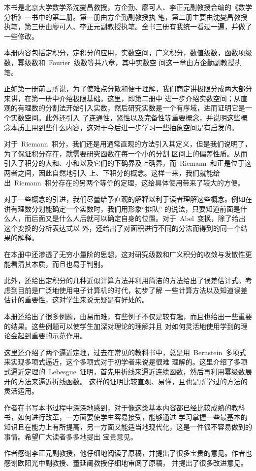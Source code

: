 
\begin{preface}
本书是北京大学数学系沈燮昌教授，方企勤、廖可人、李正元副教授合编的《数学分析》一书中的第二册。第一册由方企勤副教授执
笔，第二册主要由沈燮昌教授执笔，第三册由廖可人、李正元副教授执笔。全书三册有我统一看过一遍，并做了一些修改。

本册内容包括定积分，定积分的应用，实数空间，广义积分，数值级数，函数项级数，幂级数和~Fourier~级数等共八章，其中实数空
间这一章由方企勤副教授执笔。

正如第一册前言所说，为了使难点分散和便于理解，我们商定讲极限分成两大部分来讲，在第一册中介绍极限基础。这里，即第二册中
进一步介绍实数空间；从直观的有理数的分割法开始引入实数，然后研究实数是一个有序域，进而证明它是一个实数空间。此外还引入
了连通性，紧性以及完备性等重要概念，并说明这些概念本质上用到些什么内容，这对于今后进一步学习一些抽象空间是有启发的。

对于~Riemann~积分，我们还是用通常直观的方法引入其定义，但是我们说明了，为了保证积分存在，就需要研究函数在每一个小的分割
区间上的偏差性质。从而引入了积分的大和、小和以及它们的下确界及上确界，而~Riemann~和正是位于这两者之间，因此自然地引入
上、下积分的概念。这样一来，我们就能给出~Riemann~积分存在的另两个等价的定理，这给具体使用带来了较大的方便。

对于一些概念的引进，我们尽量给予直观的解释以利于读者理解这些概念。例如在讲有理数分划能确定一个实数时，我们用形象“排队”
的说法，只要知道前面是什么人，而后面又是什么人后就可以确定自身的位置。对于~Abel~变换，除了给出这个变换的分析表达式以
外，还给出了对面积进行不同的分法而得到的同一个结果的解释。

在本册中还渗透了无穷小量阶的思想，这对研究级数和广义积分的收敛与发散性更能看清其本质，而且也易于判别。

此外，还给出定积分的几种近似计算方法并利用简洁的方法给出了误差估计式。考虑到目前是广泛地使用电子计算机的时代，初步了解
一些计算方法以及知道误差估计的重要性，这对学生来说无疑是有好处的。

本册还给出了很多例题，由易而难，有些例子不仅是较有趣，而且也给出一些重要的结果。这些例题可以使学生加深对理论的理解并且
对如何灵活地使用学到的理论会起到重要的示范作用。

这里还介绍了两个逼近定理，过去在常见的教科书中，总是用~Bernstein~多项式来实现多项式逼近，这个多项式对于初学者来说是很难
理解的。这里介绍了多项式逼近定理的~Lebesgue~证明，首先用折线来逼近连续函数，然后再利用幂级数展开的方法来逼近折线函数。%
这样的证明比较直观、易懂，且也是所学过的方法的灵活运用。

作者在书写本书过程中深深地感到，对于像这类基本内容都已经比较成熟的教科书，如何进行改革，一方面要使学生容易接受，能够通过
学习掌握一些最基本的知识且在能力上有所提高，另一方面又能适当地现代化，这是一件很不容易做到的事情。希望广大读者多多地提出
宝贵意见。

作者感谢李正元副教授，他仔细地阅读了原稿，并提出了很多宝贵的意见。作者也感谢欧阳光中副教授、董延闿教授仔细地审阅了原稿，%
并提出了很多改进意见。
\end{preface}

\endinput

